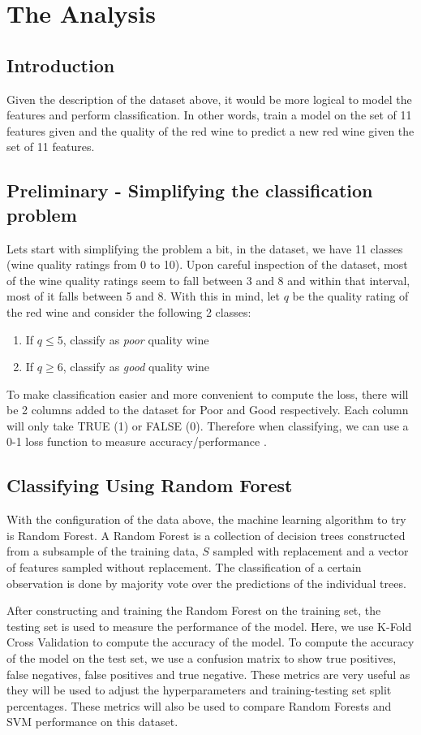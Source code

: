 \documentclass[13pt,a4paper,titlepage]{article}
\begin{document}
	\section*{The Analysis}
	\subsection*{Introduction}
	Given the description of the dataset above, it would be more logical to model the features and perform classification. In other words, train a model on the set of 11 features given and the quality of the red wine to predict a new red wine given the set of 11 features. 
	\subsection*{Preliminary - Simplifying the classification problem}	
	Lets start with simplifying the problem a bit, in the dataset, we have 11 classes (wine quality ratings from 0 to 10). Upon careful inspection of the dataset, most of the wine quality ratings seem to fall between 3 and 8 and within that interval, most of it falls between 5 and 8. With this in mind, let $q$ be the quality rating of the red wine and consider the following 2 classes:
	\begin{enumerate}
		\item If $q\leq 5$, classify as \textit{poor} quality wine
		\item If $q\geq 6$, classify as \textit{good} quality wine
	\end{enumerate}
	To make classification easier and more convenient to compute the loss, there will be 2 columns added to the dataset for Poor and Good respectively. Each column will only take TRUE (1) or FALSE (0). Therefore when classifying, we can use a 0-1 loss function to measure accuracy/performance	.
	\subsection*{Classifying Using Random Forest}
	With the configuration of the data above, the machine learning algorithm to try is Random Forest. A Random Forest is a collection of decision trees constructed from a subsample of the training data, $S$ sampled with replacement and a vector of features sampled without replacement. The classification of a certain observation is done by majority vote over the predictions of the individual trees.
	
	After constructing and training the Random Forest on the training set, the testing set is used to measure the performance of the model. Here, we use K-Fold Cross Validation to compute the accuracy of the model. To compute the accuracy of the model on the test set, we use a confusion matrix to show true positives, false negatives, false positives and true negative. These metrics are very useful as they will be used to adjust the hyperparameters and training-testing set split percentages. These metrics will also be used to compare Random Forests and SVM performance on this dataset. 
\end{document}
